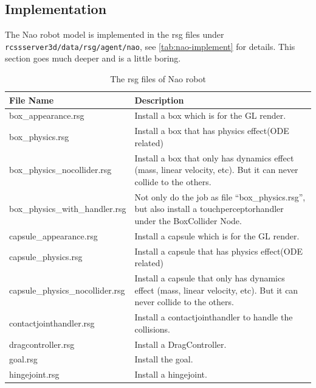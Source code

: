\subsection{Implementation}
The Nao robot model is implemented in the rsg files under
\texttt{rcssserver3d/data/rsg/agent/nao}, see \autoref{tab:nao-implement}
for details. This section goes much deeper and is a little boring.
\begin{table}[htp]
  \centering
  \caption{The rsg files of Nao robot}
  \label{tab:nao-implement}
  \begin{tabular}{lp{}}
    \hline
    {\bf File Name}             & {\bf Description} \\
    \hline
    box\_appearance.rsg         & Install a box which is for the GL
    render. \\
    box\_physics.rsg            & Install a box that has physics
    effect(ODE related) \\
    box\_physics\_nocollider.rsg & Install a box that only has dynamics
    effect (mass, linear velocity, etc). But it can never collide to
    the others. \\
    box\_physics\_with\_handler.rsg & Not only do the job as file
    “box\_physics.rsg”, but also install a touchperceptorhandler under
    the BoxCollider Node. \\
    capsule\_appearance.rsg   & Install a capsule which is
    for the GL render. \\
    capsule\_physics.rsg      & Install a capsule that has
    physics effect(ODE related) \\
    capsule\_physics\_nocollider.rsg & Install a capsule that
    only has dynamics effect (mass, linear velocity, etc). But it can
    never collide to the others. \\
    contactjointhandler.rsg    & Install a contactjointhandler to
    handle the collisions. \\
    dragcontroller.rsg         & Install a DragController. \\
    goal.rsg                   & Install the goal. \\
    hingejoint.rsg             & Install a hingejoint. \\
    \hline
  \end{tabular}
\end{table}

